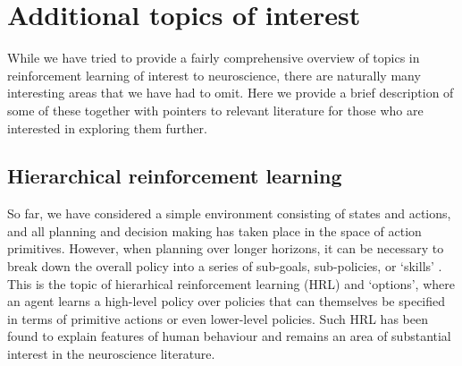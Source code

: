 \section{Additional topics of interest}
\label{sec:additional}

While we have tried to provide a fairly comprehensive overview of topics in reinforcement learning of interest to neuroscience, there are naturally many interesting areas that we have had to omit.
Here we provide a brief description of some of these together with pointers to relevant literature for those who are interested in exploring them further.

\subsection{Hierarchical reinforcement learning}
\label{sec:HRL}
So far, we have considered a simple environment consisting of states and actions, and all planning and decision making has taken place in the space of action primitives.
However, when planning over longer horizons, it can be necessary to break down the overall policy into a series of sub-goals, sub-policies, or `skills' \citep{sutton1999between, pateria2021hierarchical}.
This is the topic of hierarhical reinforcement learning (HRL) and `options', where an agent learns a high-level policy over policies that can themselves be specified in terms of primitive actions or even lower-level policies.
Such HRL has been found to explain features of human behaviour \citep{eckstein2020computational,botvinick2008hierarchical,botvinick2009hierarchically} and remains an area of substantial interest in the neuroscience literature.


